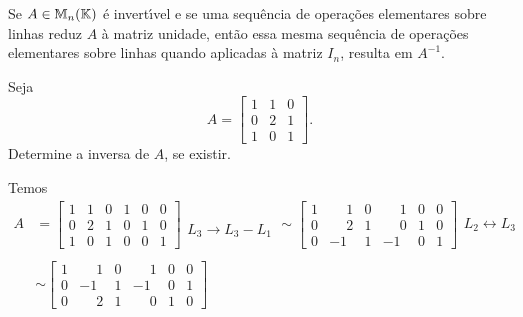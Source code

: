 \begin{corolario}
	Se $A \in \mathbb{M}_n(\mathbb{K})$ \'e invert{\'\i}vel e se uma sequ\^encia de opera\c{c}\~oes elementares sobre linhas reduz $A$ \`a matriz unidade, ent\~ao essa mesma sequ\^encia de opera\c{c}\~oes elementares sobre linhas quando aplicadas \`a matriz $I_n$, resulta em $A^{-1}$.
\end{corolario}

\begin{exemplo}
	Seja
	\[
		A =
		\begin{bmatrix}
			1 & 1 & 0\\
			0 & 2 & 1\\
			1 & 0 & 1
		\end{bmatrix}.
	\]
	Determine a inversa de $A$, se existir.
	\begin{solucao}
		Temos
		\begin{align*}
			A &= \left[
					\begin{array}{ccc|ccc}
						1 & 1 & 0 & 1 & 0 & 0 \\
						0 & 2 & 1 & 0 & 1 & 0\\
						1 & 0 & 1 & 0 & 0 & 1
					\end{array}
				\right]
				\begin{array}{l}
					\\
		    		\\
		    		L_3 \to L_3 - L_1
				\end{array} \sim
				\left[
					\begin{array}{ccc|ccc}
						1 & \phantom{-}1 & 0 & \phantom{-}1 & 0 & 0 \\
						0 & \phantom{-}2 & 1 & \phantom{-}0 & 1 & 0\\
						0 & -1 & 1 & -1 & 0 & 1
					\end{array}
				\right]
				\begin{array}{l}
					\\
			    	L_2 \leftrightarrow L_3\\
				\end{array}\\ \\ &\sim
				\left[
					\begin{array}{ccc|ccc}
						1 & \phantom{-}1 & 0 & \phantom{-}1 & 0 & 0 \\
						0 & -1 & 1 & -1 & 0 & 1\\
						0 & \phantom{-}2 & 1 & \phantom{-}0 & 1 & 0
					\end{array}
				\right]
				\begin{array}{l}
					\\

\end{array}
\end{align*}
\end{solucao}
\end{exemplo}
